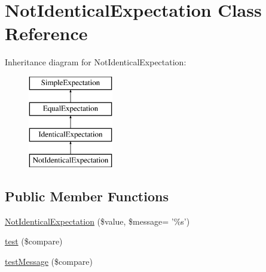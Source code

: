 \hypertarget{class_not_identical_expectation}{
\section{NotIdenticalExpectation Class Reference}
\label{class_not_identical_expectation}
}
Inheritance diagram for NotIdenticalExpectation:\begin{figure}[H]
\begin{center}
\leavevmode
\includegraphics[height=4.000000cm]{class_not_identical_expectation}
\end{center}
\end{figure}
\subsection*{Public Member Functions}
\begin{DoxyCompactItemize}
\item 
\hyperlink{class_not_identical_expectation_aa5ce1dd742efb85e079bd219234f0e99}{NotIdenticalExpectation} (\$value, \$message= '\%s')
\item 
\hyperlink{class_not_identical_expectation_a2e3d68e7804396cb418a9ef2d00c128e}{test} (\$compare)
\item 
\hyperlink{class_not_identical_expectation_a4d2927f2f29f63f7cff7e0e24a555d85}{testMessage} (\$compare)
\end{DoxyCompactItemize}



